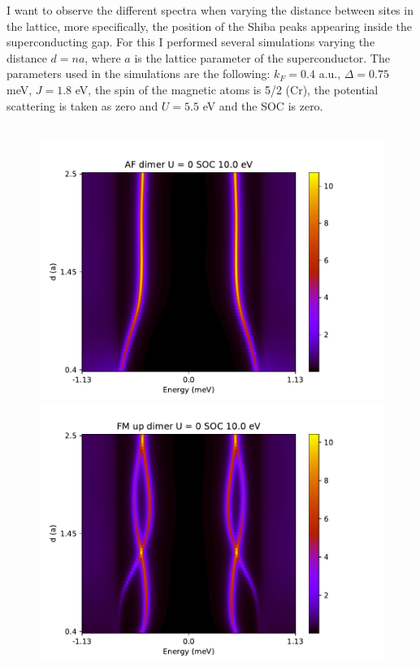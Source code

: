 \documentclass[letterpaper,12pt]{article}
\begin{document}
I want to observe the different spectra when varying the distance between sites in the lattice, more specifically, the position of the Shiba peaks appearing inside the superconducting gap. For this I performed several simulations varying the distance $d = na$, where $a$ is the lattice parameter of the superconductor. The parameters used in the simulations are the following: $k_F = 0.4$ a.u., $\Delta = 0.75$ meV, $J=1.8$ eV, the spin of the magnetic atoms is 5/2 (Cr), the potential scattering is taken as zero and $U = 5.5$ eV and the SOC is zero.\\ \\
\begin{figure}[h!]
    \centering
    \includegraphics[scale = .5]{AF_dimer_SOC_10.pdf}
    \includegraphics[scale = .5]{FM_dimer_SOC_10.pdf}
    

\end{figure}
\end{document}
